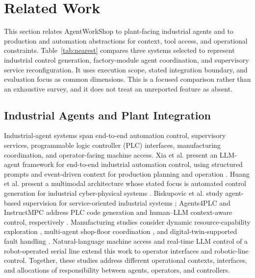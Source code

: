 \section{Related Work}
\label{sec:related}
This section relates AgentWorkShop to plant-facing industrial agents and to
production and automation abstractions for context, tool access, and
operational constraints. Table~\ref{tab:nearest} compares three systems
selected to represent industrial control generation, factory-module agent
coordination, and supervisory service reconfiguration. It uses execution
scope, stated integration boundary, and evaluation focus as common dimensions.
This is a focused comparison rather than an exhaustive survey, and it does
not treat an unreported feature as absent.

\subsection{Industrial Agents and Plant Integration}
Industrial-agent systems span end-to-end automation control, supervisory
services, programmable logic controller (PLC) interfaces, manufacturing
coordination, and operator-facing machine access. Xia et al. present an
LLM-agent framework for end-to-end industrial automation control, using
structured prompts and event-driven context for production planning and
operation \cite{xia2025control}. Huang et al. present a multimodal
architecture whose stated focus is automated control generation for
industrial cyber-physical systems \cite{huang2026made}. Biskupovic et al.
study agent-based supervision for service-oriented industrial systems
\cite{biskupovic2025supervision};
Agents4PLC and InstructMPC address PLC code generation and human--LLM
context-aware control, respectively
\cite{liu2026agents4plc,wu2025instructmpc}. Manufacturing studies consider
dynamic resource-capability exploration \cite{lim2025llmenabled}, multi-agent
shop-floor coordination \cite{zhao2026shopfloor}, and digital-twin-supported
fault handling \cite{gill2025llmdt}. Natural-language machine access
\cite{hofmann2025nlc} and real-time LLM control of a robot-operated serial
line \cite{waseem2026pretrained} extend this work to operator interfaces and
robotic-line control. Together, these studies address different operational
contexts, interfaces, and allocations of responsibility between agents,
operators, and controllers.

